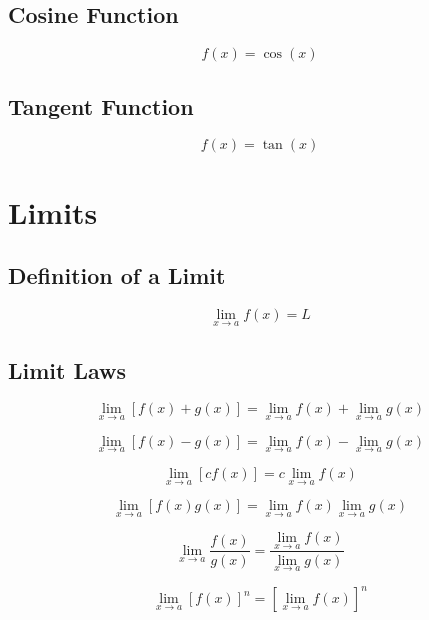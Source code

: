 \subsection{Cosine Function}
\begin{equation}
    f(x) = \cos(x)
\end{equation}

\subsection{Tangent Function}
\begin{equation}
    f(x) = \tan(x)
\end{equation}

\section{Limits}
\subsection{Definition of a Limit}
\begin{equation}
    \lim_{x \to a} f(x) = L
\end{equation}

\subsection{Limit Laws}
\begin{equation}
    \lim_{x \to a} [f(x) + g(x)] = \lim_{x \to a} f(x) + \lim_{x \to a} g(x)
\end{equation}

\begin{equation}
    \lim_{x \to a} [f(x) - g(x)] = \lim_{x \to a} f(x) - \lim_{x \to a} g(x)
\end{equation}

\begin{equation}
    \lim_{x \to a} [cf(x)] = c \lim_{x \to a} f(x)
\end{equation}

\begin{equation}
    \lim_{x \to a} [f(x)g(x)] = \lim_{x \to a} f(x) \lim_{x \to a} g(x)
\end{equation}

\begin{equation}
    \lim_{x \to a} \frac{f(x)}{g(x)} = \frac{\lim_{x \to a} f(x)}{\lim_{x \to a} g(x)}
\end{equation}

\begin{equation}
    \lim_{x \to a} [f(x)]^n = [\lim_{x \to a} f(x)]^n
\end{equation}

